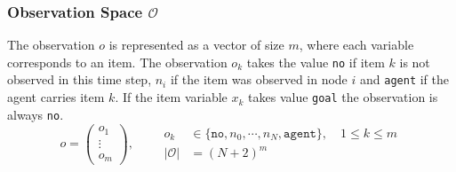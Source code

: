 \subsubsection{Observation Space $\mathcal{O}$}
The observation $o$ is represented as a vector of size $m$, where each variable corresponds to an item. The observation $o_k$ takes the value \texttt{no} if item $k$ is not observed in this time step, $n_i$ if the item was observed in node $i$ and \texttt{agent} if the agent carries item $k$. If the item variable $x_k$ takes value \texttt{goal} the observation is always \texttt{no}.
\begin{equation}
    o = \begin{pmatrix} o_1 \\ \vdots \\ o_m \end{pmatrix}, \qquad \begin{aligned} o_k &\in \{ \texttt{no}, n_0, \cdots, n_N, \texttt{agent} \}, \quad 1 \leq k \leq m\\
    |\mathcal{O}|&= (N+2)^m \end{aligned}
\end{equation}
